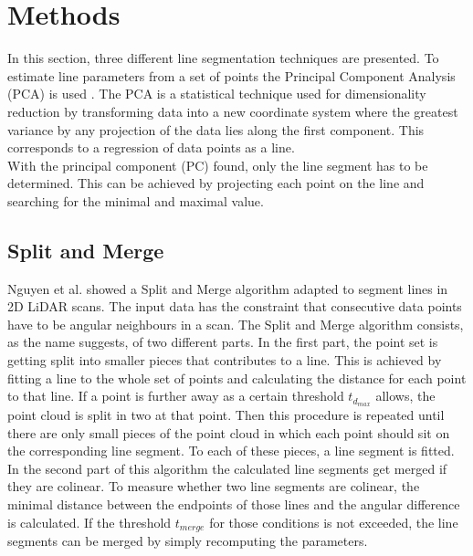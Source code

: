 \documentclass{scp}
\begin{document}
\section{Methods} 
In this section, three different line segmentation techniques are presented. To estimate line parameters from a set of points the Principal Component Analysis (PCA) is used \cite{pca}. The PCA is a statistical technique used for dimensionality reduction by transforming data into a new coordinate system where the greatest variance by any projection of the data lies along the first component. This corresponds to a regression of data points as a line.\\
With the principal component (PC) found, only the line segment has to be determined. This can be achieved by projecting each point on the line and searching for the minimal and maximal value.

\subsection*{Split and Merge} \label{sec:SNM}
Nguyen et al. showed a Split and Merge algorithm adapted to segment lines in 2D LiDAR scans. The input data has the constraint that consecutive data points have to be angular neighbours in a scan. The Split and Merge algorithm consists, as the name suggests, of two different parts. In the first part, the point set is getting split into smaller pieces that contributes to a line. This is achieved by fitting a line to the whole set of points and calculating the distance for each point to that line. If a point is further away as a certain threshold $t_{d_{max}}$ allows, the point cloud is split in two at that point. Then this procedure is repeated until there are only small pieces of the point cloud in which each point should sit on the corresponding line segment. To each of these pieces, a line segment is fitted. \\
In the second part of this algorithm the calculated line segments get merged if they are colinear. To measure whether two line segments are colinear, the minimal distance between the endpoints of those lines and the angular difference is calculated. If the threshold $t_{merge}$ for those conditions is not exceeded, the line segments can be merged by simply recomputing the parameters. 

\end{document}
